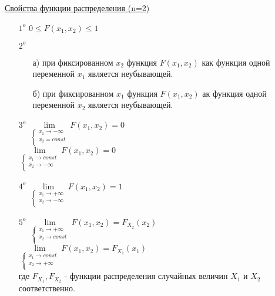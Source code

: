 \underline{Свойства функции распределения (n=2)}
\begin{enumerate}
\item[$1^o$] $0 \leqslant F(x_1, x_2) \leqslant 1$

\item[$2^o$] 
	\begin{enumerate}
	\item[а)] при фиксированном $x_2$ функция $F(x_1, x_2)$ как функция одной переменной $x_1$ является неубывающей.
	
	\item[б)] при фиксированном $x_1$ функция $F(x_1, x_2)$ ак функция одной переменной $x_2$ является неубывающей.
	\end{enumerate}
	
\item[$3^o$] $\lim\limits_{\begin{cases} x_1 \to -\infty \\ x_2 = const \\ \end{cases}} F(x_1, x_2) = 0$\\
$\lim\limits_{\begin{cases} x_1 \to const \\ x_2 \to -\infty \\ \end{cases}} F(x_1, x_2) = 0$ \\

\item[$4^o$] $\lim\limits_{\begin{cases} x_1 \to +\infty \\ x_2 \to -\infty \\ \end{cases}} F(x_1, x_2) = 1$ \\

\item[$5^o$] $\lim\limits_{\begin{cases} x_1 \to +\infty \\ x_2 \to const \\ \end{cases}} F(x_1, x_2) = F_{X_2}(x_2)$ \\
$\lim\limits_{\begin{cases} x_1 \to const \\ x_2 \to +\infty \\ \end{cases}} F(x_1, x_2) = F_{X_1}(x_1)$ \\
где $F_{X_1}, F_{X_2}$ - функции распределения случайных величин $X_1$ и $X_2$ соответственно. 


\end{enumerate}
